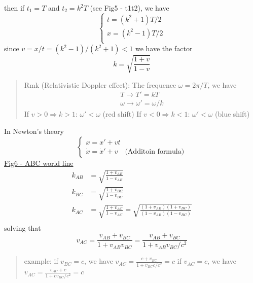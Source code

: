 \documentclass[12pt]{article}
\begin{document}
then if $t_1=T$ and $t_2=k^2T$ (see Fig5 - t1t2), we have
\begin{equation}
\begin{cases}
t = (k^2+1)T/2\\
x = (k^2-1)T/2\\
\end{cases}
\end{equation}
since $v=x/t=(k^2-1)/(k^2+1)<1$ we have the factor
\begin{equation}
k=\sqrt{\frac{1+v}{1-v}}
\end{equation}


\begin{quote}
	Rmk (Relativistic Doppler effect):
The frequence $\omega = 2\pi/T$, we have
\begin{equation}
\begin{aligned}
T\to T'=kT\\
\omega \to \omega' = \omega/k
\end{aligned}
\end{equation}
If $v>0\Rightarrow k>1$: $\omega'<\omega$ (red shift)
If $v<0\Rightarrow k<1$: $\omega'<\omega$ (blue shift)
\end{quote}

In Newton's theory 
\begin{equation}
\begin{cases}
x=x'+vt\\
\dot{x} = \dot{x}' + v\quad\text{(Additoin formula)}
\end{cases}
\end{equation}
\underline{Fig6 - ABC world line}
\begin{equation}
\begin{aligned}
k_{AB} &= \sqrt{\frac{1+v_{AB}}{1-v_{AB}}}\\
k_{BC} &= \sqrt{\frac{1+v_{BC}}{1-v_{BC}}}\\
k_{AC} &= \sqrt{\frac{1+v_{AC}}{1-v_{AC}}}
= \sqrt{\frac{(1+v_{AB})(1+v_{BC})}{(1-v_{AB})(1-v_{BC})}}\\
\end{aligned}
\end{equation}
solving that 
\begin{equation}
v_{AC} = \frac{v_{AB}+v_{BC}}{1+v_{AB}v_{BC}} = \frac{v_{AB}+v_{BC}}{1+v_{AB}v_{BC}/c^2}
\end{equation}


\begin{quote}
	example:
if $v_{BC} = c$​, we have $\displaystyle v_{AC}=\frac{c+v_{BC}}{1+v_{BC}c/c^2} = c$
if $v_{AC} = c$, we have $\displaystyle v_{AC}=\frac{v_{AC}+c}{1+cv_{BC}/c^2} = c$
\end{quote}
\end{document}
